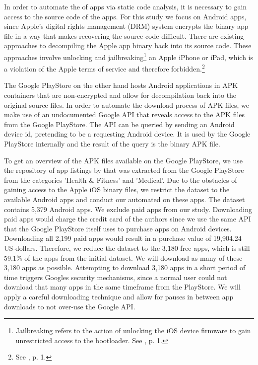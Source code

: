 \documentclass[
	a4paper,
	oneside,
	12pt,
	liststotocnumbered
]{article}
\let\cite\textcite
\begin{document}
In order to automate the \pra of \mH apps via static code analysis, it is necessary to gain access to the source code of the apps. 
For this study we focus on Android apps, since Apple's digital rights management (\acs{DRM}) system encrypts the binary app file in a way that makes recovering the source code difficult. 
There are existing approaches to decompiling the Apple app binary back into its source code.
These approaches involve unlocking and jailbreaking\footnote{Jailbreaking refers to the action of unlocking the iOS device firmware to gain unrestricted access to the bootloader. See \cite{Kweller2010}, p. 1.}
an Apple iPhone or iPad, which is a violation of the Apple terms of service and therefore forbidden.\footnote{See \cite{Kweller2010}, p. 1.}

The Google PlayStore on the other hand hosts Android applications in \acs{APK} containers that are non-encrypted and allow for decompilation back into the original source files. 
In order to automate the download process of \acs{APK} files, we make use of an undocumented Google \acs{API} that reveals access to the \acs{APK} files from the Google PlayStore. 
The \acs{API} can be queried by sending an Android device id, pretending to be a requesting Android device. It is used by the Google PlayStore internally and the result of the query is the binary \acs{APK} file.

To get an overview of the APK files available on the Google PlayStore, we use the repository of app listings by \cite{Xu2015} that was extracted from the Google PlayStore from the categories 'Health \& Fitness' and 'Medical'.
Due to the obstacles of gaining access to the Apple iOS binary files, we restrict the dataset to the available Android apps and conduct our automated \pra on these apps.
The \cite{Xu2015} dataset contains 5,379 Android apps. 
We exclude paid apps from our study. Downloading paid apps would charge the credit card of the authors since we use the same \acs{API} that the Google PlayStore itself uses to purchase apps on Android devices. 
Downloading all 2,199 paid apps would result in a purchase value of 19,904.24 US-dollars. 
Therefore, we reduce the dataset to the 3,180 free apps, which is still 59.1\% of the apps from the initial dataset. 
We will download as many of these 3,180 apps as possible.
Attempting to download 3,180 apps in a short period of time triggers Googles security mechanisms, since a normal user could not download that many apps in the same timeframe from the PlayStore.
We will apply a careful downloading technique and allow for pauses in between app downloads to not over-use the Google API.
\end{document}
